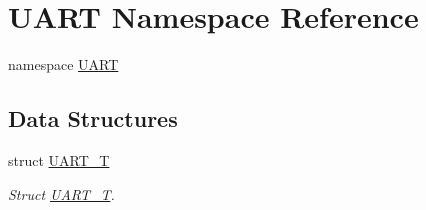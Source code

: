 \hypertarget{namespace_u_a_r_t}{}\section{U\+A\+RT Namespace Reference}
\label{namespace_u_a_r_t}


namespace \mbox{\hyperlink{namespace_u_a_r_t}{U\+A\+RT}}  


\subsection*{Data Structures}
\begin{DoxyCompactItemize}
\item 
struct \mbox{\hyperlink{struct_u_a_r_t_1_1_u_a_r_t___t}{U\+A\+R\+T\+\_\+T}}
\begin{DoxyCompactList}\small\item\em Struct \mbox{\hyperlink{struct_u_a_r_t_1_1_u_a_r_t___t}{U\+A\+R\+T\+\_\+T}}. \end{DoxyCompactList}\end{DoxyCompactItemize}
